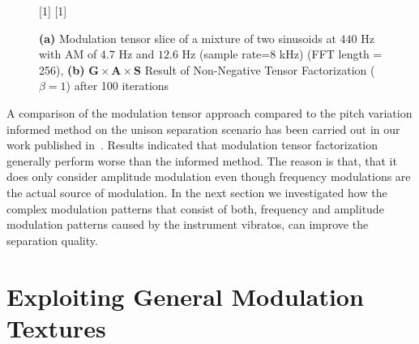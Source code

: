 \begin{figure}[h]
\centering
[1\textwidth]{}%
\hspace{0.3\textwidth} %
[1\textwidth]{}%
\caption{\textbf{(a)} Modulation tensor slice of a mixture of two sinusoids at $440$ Hz with AM of $4.7$ Hz and $12.6$ Hz (sample rate=$8$ kHz)  (FFT length = 256), \textbf{(b)}  $\mathbf{G} \times \mathbf{A} \times \mathbf{S} $ Result of Non-Negative Tensor Factorization ($\beta = 1$) after 100 iterations}
\label{fig:am_ntf}
\end{figure}
\par
A comparison of the modulation tensor approach compared to the pitch variation informed method on the unison separation scenario has been carried out in our work published in~\cite{stoeter14}.
Results indicated that modulation tensor factorization generally perform  worse than the informed method.
The reason is that, that it does only consider amplitude modulation even though frequency modulations are the actual source of modulation.
In the next section we investigated how the complex modulation patterns that consist of both, frequency and amplitude modulation patterns caused by the instrument vibratos, can improve the separation quality.

\section{Exploiting General Modulation Textures}


